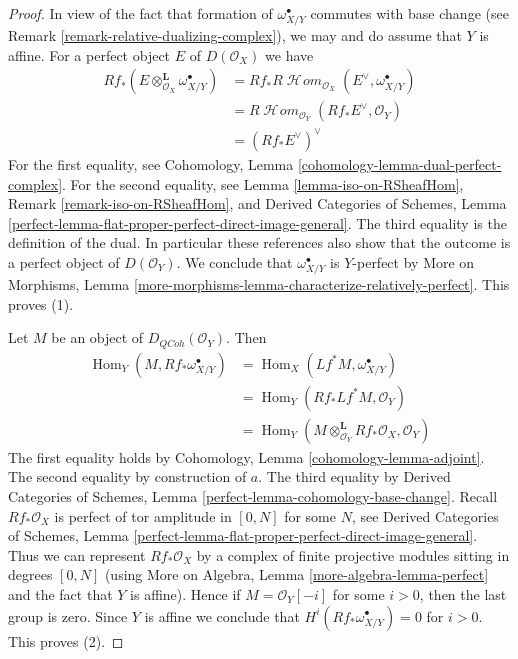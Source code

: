 \documentclass{stacks-project}
\theoremstyle{plain}
\theoremstyle{definition}
\theoremstyle{remark}
\numberwithin{equation}{subsection}
\def\Hom{\mathop{\mathrm{Hom}}\nolimits}
\def\SheafHom{\mathop{\mathcal{H}\!\mathit{om}}\nolimits}
\def\QCoh{\mathit{QCoh}}
\begin{document}
\begin{proof}
In view of the fact that formation of $\omega_{X/Y}^\bullet$ commutes
with base change (see Remark \ref{remark-relative-dualizing-complex}),
we may and do assume that $Y$ is affine. For a perfect object $E$ of
$D(\mathcal{O}_X)$ we have
\begin{align*}
Rf_*(E \otimes_{\mathcal{O}_X}^\mathbf{L} \omega_{X/Y}^\bullet)
& =
Rf_*R\SheafHom_{\mathcal{O}_X}(E^\vee, \omega_{X/Y}^\bullet) \\
& =
R\SheafHom_{\mathcal{O}_Y}(Rf_*E^\vee, \mathcal{O}_Y) \\
& =
(Rf_*E^\vee)^\vee
\end{align*}
For the first equality, see
Cohomology, Lemma \ref{cohomology-lemma-dual-perfect-complex}.
For the second equality, see Lemma \ref{lemma-iso-on-RSheafHom},
Remark \ref{remark-iso-on-RSheafHom}, and 
Derived Categories of Schemes, Lemma
\ref{perfect-lemma-flat-proper-perfect-direct-image-general}.
The third equality is the definition of the dual. In particular
these references also show that the outcome is a perfect object
of $D(\mathcal{O}_Y)$. We conclude that $\omega_{X/Y}^\bullet$
is $Y$-perfect by More on Morphisms, Lemma
\ref{more-morphisms-lemma-characterize-relatively-perfect}.
This proves (1).

\medskip\noindent
Let $M$ be an object of $D_\QCoh(\mathcal{O}_Y)$. Then
\begin{align*}
\Hom_Y(M, Rf_*\omega_{X/Y}^\bullet) & =
\Hom_X(Lf^*M, \omega_{X/Y}^\bullet) \\
& =
\Hom_Y(Rf_*Lf^*M, \mathcal{O}_Y) \\
& =
\Hom_Y(M \otimes_{\mathcal{O}_Y}^\mathbf{L} Rf_*\mathcal{O}_X, \mathcal{O}_Y)
\end{align*}
The first equality holds by Cohomology, Lemma
\ref{cohomology-lemma-adjoint}.
The second equality by construction of $a$.
The third equality by Derived Categories of Schemes, Lemma
\ref{perfect-lemma-cohomology-base-change}.
Recall $Rf_*\mathcal{O}_X$ is perfect of tor amplitude in $[0, N]$
for some $N$, see
Derived Categories of Schemes, Lemma
\ref{perfect-lemma-flat-proper-perfect-direct-image-general}.
Thus we can represent $Rf_*\mathcal{O}_X$ by a complex of
finite projective modules sitting in degrees $[0, N]$
(using More on Algebra, Lemma \ref{more-algebra-lemma-perfect}
and the fact that $Y$ is affine).
Hence if $M = \mathcal{O}_Y[-i]$ for some $i > 0$, then the last
group is zero. Since $Y$ is affine we conclude that
$H^i(Rf_*\omega_{X/Y}^\bullet) = 0$ for $i > 0$.
This proves (2).


\end{proof}
\end{document}
